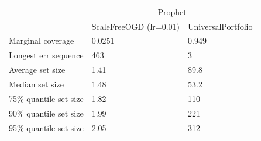 \begin{tabular}{lll}
\toprule
& \multicolumn{2}{c}{Prophet} \\
& ScaleFreeOGD (lr=0.01) & UniversalPortfolio \\
\midrule
Marginal coverage & 0.0251 & 0.949 \\
Longest err sequence & 463 & 3 \\
Average set size & 1.41 & 89.8 \\
Median set size & 1.48 & 53.2 \\
75\% quantile set size & 1.82 & 110 \\
90\% quantile set size & 1.99 & 221 \\
95\% quantile set size & 2.05 & 312 \\
\bottomrule
\end{tabular}
